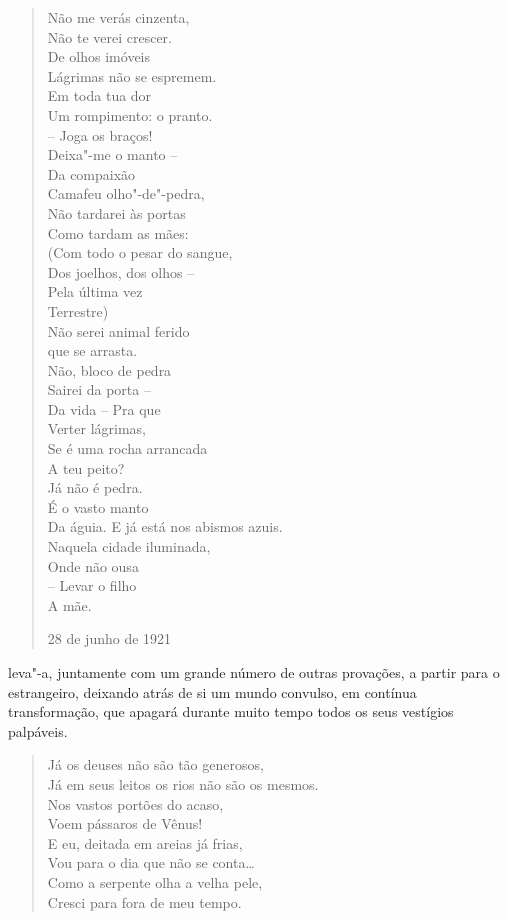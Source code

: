 {\begin{verse}
Não me verás cinzenta, \\
Não te verei crescer. \\
De olhos imóveis \\
Lágrimas não se espremem. \\[8pt]
Em toda tua dor \\
Um rompimento: o pranto. \\
-- Joga os braços! \\
Deixa"-me o manto -- \\[8pt]
Da compaixão \\
Camafeu olho"-de"-pedra, \\
Não tardarei às portas \\
Como tardam as mães: \\[8pt]
(Com todo o pesar do sangue, \\
Dos joelhos, dos olhos -- \\
Pela última vez \\
Terrestre) \\
Não serei animal ferido \\
que se arrasta. \\[8pt]
Não, bloco de pedra \\
Sairei da porta -- \\
Da vida -- Pra que \\
Verter lágrimas, \\
Se é uma rocha arrancada \\
A teu peito? \\[8pt]
Já não é pedra. \\
É o vasto manto \\
Da águia. E já está nos abismos azuis. \\
Naquela cidade iluminada, \\
Onde não ousa \\
-- Levar o filho \\
A mãe.

28 de junho de 1921

\end{verse}

leva"-a, juntamente com um grande número de outras provações, a partir
para o estrangeiro, deixando atrás de si um mundo convulso, em contínua
transformação, que apagará durante muito tempo todos os seus vestígios
palpáveis.

\begin{verse}
Já os deuses não são tão generosos, \\
Já em seus leitos os rios não são os mesmos. \\
Nos vastos portões do acaso, \\
Voem pássaros de Vênus! \\[8pt]
E eu, deitada em areias já frias, \\
Vou para o dia que não se conta\ldots{} \\
Como a serpente olha a velha pele, \\
Cresci para fora de meu tempo. 


\end{verse}}
